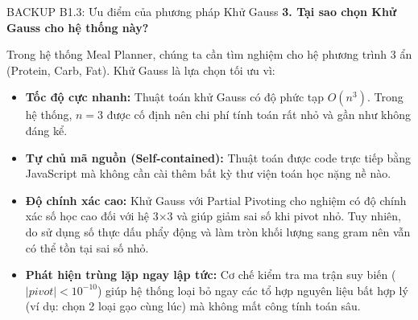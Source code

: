\documentclass[10pt, aspectratio=169]{beamer}
\begin{document}
\begin{frame}[label=b1_3]{BACKUP B1.3: Ưu điểm của phương pháp Khử Gauss}
\hypertarget{b1_3_target}{}
    \textbf{3. Tại sao chọn Khử Gauss cho hệ thống này?}
    \vspace{0.2cm}
    
    Trong hệ thống Meal Planner, chúng ta cần tìm nghiệm cho hệ phương trình 3 ẩn (Protein, Carb, Fat). Khử Gauss là lựa chọn tối ưu vì:
    \vspace{0.2cm}
    
    \begin{itemize}
        \item \textbf{Tốc độ cực nhanh:} Thuật toán khử Gauss có độ phức tạp $O(n^3)$. Trong hệ thống, $n = 3$ được cố định nên chi phí tính toán rất nhỏ và gần như không đáng kể.
        \vspace{0.2cm}
        \item \textbf{Tự chủ mã nguồn (Self-contained):} Thuật toán được code trực tiếp bằng JavaScript mà không cần cài thêm bất kỳ thư viện toán học nặng nề nào.
        \vspace{0.2cm}
        \item \textbf{Độ chính xác cao:} Khử Gauss với Partial Pivoting cho nghiệm có độ chính xác số học cao đối với hệ 3×3 và giúp giảm sai số khi pivot nhỏ. Tuy nhiên, do sử dụng số thực dấu phẩy động và làm tròn khối lượng sang gram nên vẫn có thể tồn tại sai số nhỏ.
        \vspace{0.2cm}
        \item \textbf{Phát hiện trùng lặp ngay lập tức:} Cơ chế kiểm tra ma trận suy biến ($|pivot| < 10^{-10}$) giúp hệ thống loại bỏ ngay các tổ hợp nguyên liệu bất hợp lý (ví dụ: chọn 2 loại gạo cùng lúc) mà không mất công tính toán sâu.
    \end{itemize}
\end{frame}
\end{document}
